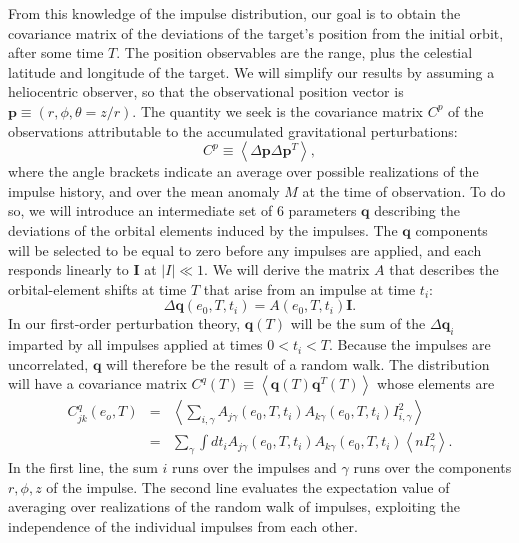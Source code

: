\documentclass[linenumbers, onecolumn]{aastex631}
\newcommand{\vecI}{\mathbf{I}}
\newcommand{\vecp}{\mathbf{p}}
\newcommand{\vecq}{\mathbf{q}}
\newcommand{\matA}{A}
\newcommand{\covm}{C}
\begin{document}
From this knowledge of the impulse distribution, our goal is to obtain
the covariance matrix of the deviations of the target's position from
the initial orbit, after some time $T.$ The position observables are
the range, plus the celestial latitude and longitude of the target.  We will simplify our results by assuming a heliocentric observer, so that the observational position vector is $\vecp\equiv (r,\phi,\theta=z/r).$ The quantity we seek is the covariance matrix $\covm^p$ of the observations attributable to the accumulated gravitational perturbations:
\begin{equation}
  \covm^p  \equiv  \left\langle  \Delta\vecp \Delta\vecp^T\right\rangle,  \label{eq:Cp}
\end{equation}
where the angle brackets indicate an average over possible
realizations of the impulse history, and over the mean anomaly $M$ at the time of observation.  To do so, we will introduce an intermediate set of 6 parameters $\vecq$ describing the deviations of the orbital elements induced by the impulses.  The $\vecq$ components will be selected to be equal to zero before any impulses are applied, and each responds linearly to $\vecI$ at $|I|\ll 1.$
We will derive the matrix $\matA$ that describes the orbital-element shifts at time $T$ that arise from an impulse at time $t_i$: 
\begin{equation}
  \Delta \vecq(e_0,T,t_i) = \matA(e_0, T, t_i) \vecI.
  \label{eq:A}
\end{equation}
In our first-order perturbation theory, $\vecq(T)$ will be the sum of the $\Delta\vecq_i$ imparted by all impulses applied at times $0<t_i<T.$  Because the impulses are uncorrelated, $\vecq$ will therefore be the result of a random walk.  The distribution will have a covariance matrix $\covm^q(T) \equiv \left\langle \vecq(T) \vecq^T(T) \right\rangle$ whose elements are
\begin{eqnarray}
  \covm^q_{jk}(e_o,T) & = & \left\langle \sum_{i,\gamma} \matA_{j\gamma}(e_0,T,t_i) \matA_{k\gamma}(e_0,T,t_i) I^2_{i,\gamma} \right\rangle \\
           & = & \sum_\gamma \int dt_i \matA_{j\gamma}(e_0,T,t_i) \matA_{k\gamma}(e_0,T,t_i) \left\langle n I_\gamma^2\right\rangle.
\label{eq:Cqjk}
\end{eqnarray}
In the first line, the sum $i$ runs over the impulses and $\gamma$ runs over the components $r,\phi,z$ of the impulse. The second line evaluates the expectation value of averaging over realizations of the random walk of impulses, exploiting the independence of the individual impulses from each other.
\end{document}

